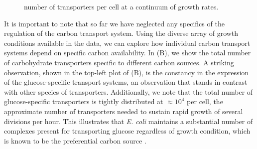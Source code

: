 \begin{figure}
\begin{fullwidth}
{    number of transporters per cell at a continuum of growth
    rates.}\label{fig:carbon_tport} \label{figsupp:phospho_sulfo}
    \end{fullwidth}
\end{figure}

It is important to note that so far we have neglected any specifics of the
regulation of the carbon transport system. Using the diverse array of
growth conditions available in the data, we can explore how individual carbon
transport systems depend on specific carbon availability. In
(B), we show the total number of carbohydrate transporters
specific to different carbon sources. A striking observation, shown in the
top-left plot of (B), is the constancy in the expression of
the glucose-specific transport systems, an observation that stands in contrast
with other species of transporters. Additionally, we note that the total
number of glucose-specific transporters is tightly distributed at $\approx 10^4$
per cell, the approximate number of transporters needed to sustain rapid growth
of several divisions per hour. This illustrates that \textit{E. coli} maintains
a substantial number of complexes present for transporting glucose regardless of
growth condition, which is known to be the preferential carbon source
\citep{monod1947, liu2005a, aidelberg2014}.

